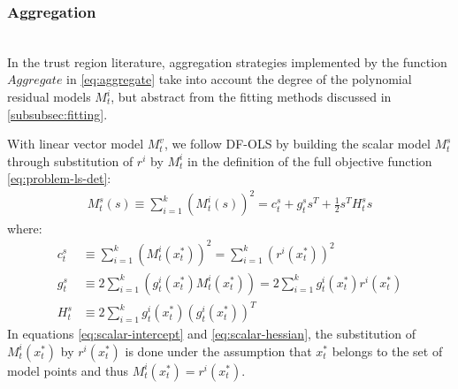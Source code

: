 \subsubsection{Aggregation}
\label{subsubsec:aggregation}
\hfill\\





In the trust region literature, aggregation strategies implemented by the function $Aggregate$ in \ref{eq:aggregate} take into account the degree of the polynomial residual models $M_t^i$, but abstract from the fitting methods discussed in \ref{subsubsec:fitting}.

With linear vector model $M_t^v$, we follow DF-OLS by building the scalar model $M_t^s$ through substitution of $r^i$ by $M_t^i$ in the definition of the full objective function \ref{eq:problem-ls-det}:
\begin{align}
    M_t^s(s)\equiv\sum\limits_{i=1}^k(M_t^i(s))^2 =  c_t^s+g^s_ts^T+\frac{1}{2}s^TH^s_ts
\end{align}
where:
\begin{align}
    c_t^s &\equiv\sum\limits_{i=1}^k(M_t^i(x_t^*))^2 = \sum\limits_{i=1}^k(r^i(x_t^*))^2\label{eq:scalar-intercept}\\
     g^s_t&\equiv2\sum\limits_{i=1}^k(g_t^i(x_t^*)M_t^i(x_t^*))=2\sum\limits_{i=1}^kg_t^i(x_t^*)r^i(x_t^*)\label{eq:scalar-gradient}\\
     H_t^s&\equiv2\sum\limits_{i=1}^kg_t^i(x_t^*)(g_t^i(x_t^*))^T\label{eq:scalar-hessian}
\end{align}
In equations \ref{eq:scalar-intercept} and \ref{eq:scalar-hessian}, the substitution of $M_t^i(x_t^*)$ by $r^i(x_t^*)$ is done under the assumption that $x_t^*$ belongs to the set of model points and thus $M_t^i(x_t^*)=r^i(x_t^*)$.

